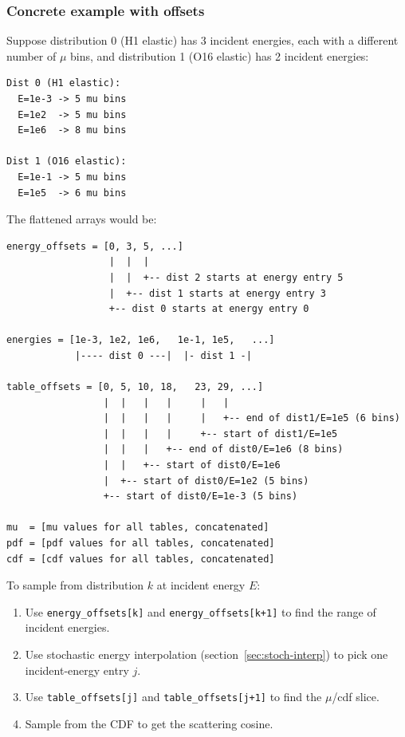 \documentclass[11pt,a4paper]{article}
\begin{document}
\subsubsection{Concrete example with offsets}
Suppose distribution 0 (H1 elastic) has 3 incident energies, each with a different number of $\mu$ bins, and distribution 1 (O16 elastic) has 2 incident energies:

\begin{lstlisting}
Dist 0 (H1 elastic):
  E=1e-3 -> 5 mu bins
  E=1e2  -> 5 mu bins
  E=1e6  -> 8 mu bins

Dist 1 (O16 elastic):
  E=1e-1 -> 5 mu bins
  E=1e5  -> 6 mu bins
\end{lstlisting}

The flattened arrays would be:

\begin{lstlisting}
energy_offsets = [0, 3, 5, ...]
                  |  |  |
                  |  |  +-- dist 2 starts at energy entry 5
                  |  +-- dist 1 starts at energy entry 3
                  +-- dist 0 starts at energy entry 0

energies = [1e-3, 1e2, 1e6,   1e-1, 1e5,   ...]
            |---- dist 0 ---|  |- dist 1 -|

table_offsets = [0, 5, 10, 18,   23, 29, ...]
                 |  |   |   |     |   |
                 |  |   |   |     |   +-- end of dist1/E=1e5 (6 bins)
                 |  |   |   |     +-- start of dist1/E=1e5
                 |  |   |   +-- end of dist0/E=1e6 (8 bins)
                 |  |   +-- start of dist0/E=1e6
                 |  +-- start of dist0/E=1e2 (5 bins)
                 +-- start of dist0/E=1e-3 (5 bins)

mu  = [mu values for all tables, concatenated]
pdf = [pdf values for all tables, concatenated]
cdf = [cdf values for all tables, concatenated]
\end{lstlisting}

To sample from distribution $k$ at incident energy $E$:
\begin{enumerate}[leftmargin=1.4em]
  \item Use \texttt{energy\_offsets[k]} and \texttt{energy\_offsets[k+1]} to find the range of incident energies.
  \item Use stochastic energy interpolation (section~\ref{sec:stoch-interp}) to pick one incident-energy entry $j$.
  \item Use \texttt{table\_offsets[j]} and \texttt{table\_offsets[j+1]} to find the $\mu$/cdf slice.
  \item Sample from the CDF to get the scattering cosine.
\end{enumerate}
\end{document}
